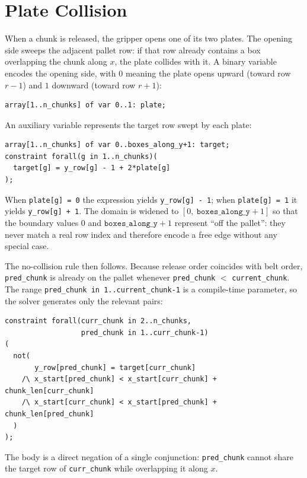 \section{Plate Collision}
\label{sec:release}

When a chunk is released, the gripper opens one of its two plates. The
opening side sweeps the adjacent pallet row: if that row already contains
a box overlapping the chunk along \(x\), the plate collides with it. A
binary variable encodes the opening side, with \(0\) meaning the plate
opens upward (toward row \(r-1\)) and \(1\) downward (toward row \(r+1\)):

\vspace{0.5cm}
\begin{lstlisting}
array[1..n_chunks] of var 0..1: plate;
\end{lstlisting}
\vspace{0.5cm}

An auxiliary variable represents the target row swept by each plate:

\vspace{0.5cm}
\begin{lstlisting}
array[1..n_chunks] of var 0..boxes_along_y+1: target;
constraint forall(g in 1..n_chunks)(
  target[g] = y_row[g] - 1 + 2*plate[g]
);
\end{lstlisting}
\vspace{0.5cm}

When \texttt{plate[g] = 0} the expression yields \texttt{y\_row[g] - 1};
when \texttt{plate[g] = 1} it yields \texttt{y\_row[g] + 1}. The domain
is widened to \([0,\ \texttt{boxes\_along\_y}+1]\) so that the boundary
values \(0\) and \(\texttt{boxes\_along\_y}+1\) represent ``off the
pallet'': they never match a real row index and therefore encode a free
edge without any special case.

The no-collision rule then follows. Because release order coincides with
belt order, \texttt{pred\_chunk} is already on the pallet whenever
\texttt{pred\_chunk} $<$ \texttt{current\_chunk}. The range
\texttt{pred\_chunk in 1..current\_chunk-1} is a compile-time parameter,
so the solver generates only the relevant pairs:

\vspace{0.5cm}
\begin{lstlisting}
constraint forall(curr_chunk in 2..n_chunks,
                  pred_chunk in 1..curr_chunk-1)
(
  not(
       y_row[pred_chunk] = target[curr_chunk]
    /\ x_start[pred_chunk] < x_start[curr_chunk] + chunk_len[curr_chunk]
    /\ x_start[curr_chunk] < x_start[pred_chunk] + chunk_len[pred_chunk]
  )
);
\end{lstlisting}
\vspace{0.5cm}

The body is a direct negation of a single conjunction:
\texttt{pred\_chunk} cannot share the target row of
\texttt{curr\_chunk} while overlapping it along \(x\).